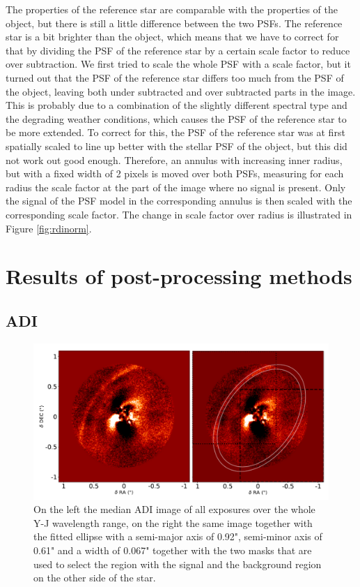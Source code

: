 \documentclass[twoside,single,12pt]{lion-msc}
\begin{document}
The properties of the reference star are comparable with the properties of the object, but there is still a little difference between the two PSFs. The reference star is a bit brighter than the object, which means that we have to correct for that by dividing the PSF of the reference star by a certain scale factor to reduce over subtraction. We first tried to scale the whole PSF with a scale factor, but it turned out that the PSF of the reference star differs too much from the PSF of the object, leaving both under subtracted and over subtracted parts in the image. This is probably due to a combination of the slightly different spectral type and the degrading weather conditions, which causes the PSF of the reference star to be more extended. To correct for this, the PSF of the reference star was at first spatially scaled to line up better with the stellar PSF of the object, but this did not work out good enough. Therefore, an annulus with increasing inner radius, but with a fixed width of 2 pixels is moved over both PSFs, measuring for each radius the scale factor at the part of the image where no signal is present. Only the signal of the PSF model in the corresponding annulus is then scaled with the corresponding scale factor. The change in scale factor over radius is illustrated in Figure \ref{fig:rdinorm}.

\chapter{Results of post-processing methods}
\section{ADI}
\begin{figure}[!b]
\centering 
\vspace{-0.5cm}
\includegraphics[trim={0cm 0cm 0cm 0cm},clip,width = \textwidth]{twoADIS}
\caption{On the left the median ADI image of all exposures over the whole Y-J wavelength range, on the right the same image together with the fitted ellipse with a semi-major axis of 0.92", semi-minor axis of 0.61" and a width of 0.067" together with the two masks that are used to select the region with the signal and the background region on the other side of the star.} 
\label{fig:aditot}
\vspace{-0.3cm}
\end{figure}
\end{document}
